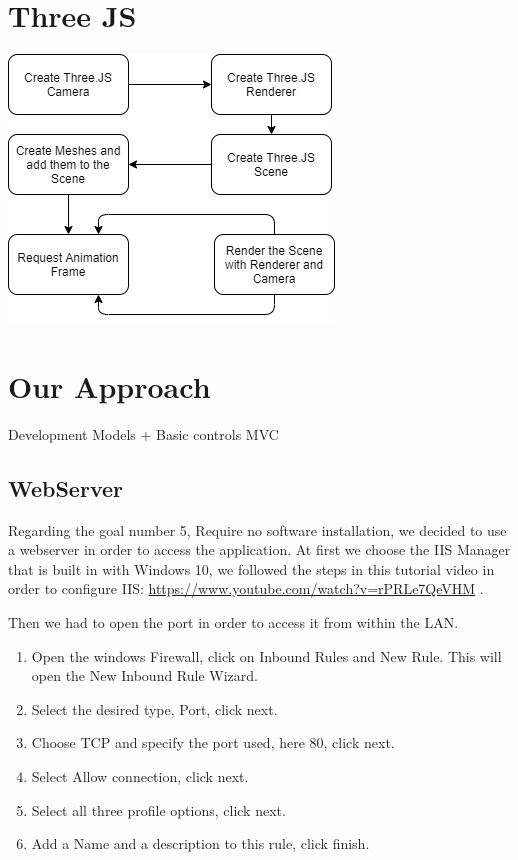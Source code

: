 \documentclass{scrartcl}
\begin{document}
\section{Three JS}

\begin{center}
  \includegraphics[width=\textwidth]{./basic_threejs_rendering}
\end{center}

\section{Our Approach}

Development
Models + Basic controls
MVC
\subsection{WebServer}
Regarding the goal number 5, Require no software installation, we decided to use a webserver in order to access the application. At first we choose the IIS Manager that is built in with Windows 10, 
we followed the steps in this tutorial video in order to configure IIS: \url{https://www.youtube.com/watch?v=rPRLe7QeVHM} .

Then we had to open the port in order to access it from within the LAN.
\begin{enumerate}
  \item Open the windows Firewall, click on Inbound Rules and New Rule. This will open the New Inbound Rule Wizard.
  \item Select the desired type, Port, click next.
  \item Choose TCP and specify the port used, here 80, click next.
  \item Select Allow connection, click next.
  \item Select all three profile options, click next.
  \item Add a Name and a description to this rule, click finish.
\end{enumerate}
\end{document}
